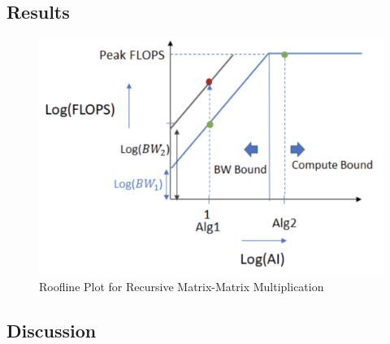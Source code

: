 \documentclass{article}
\begin{document}
\subsection{Results}
\begin{figure}[!htb]
    \centering
    \includegraphics[width=0.8\linewidth]{roofline_plot.png}
    \caption{Roofline Plot for Recursive Matrix-Matrix Multiplication}
\end{figure}

\subsection{Discussion}
\begin{verbatim}
\end{verbatim}
\end{document}
